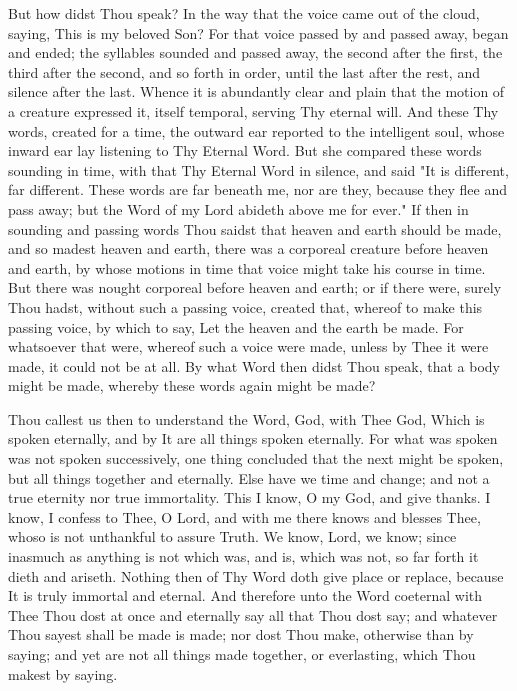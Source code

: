 \documentclass[b5paper,openright,12pt,twoside]{book}
\begin{document}
But how didst Thou speak? In the way that the voice came out of the
cloud, saying, This is my beloved Son? For that voice passed by and
passed away, began and ended; the syllables sounded and passed away,
the second after the first, the third after the second, and so forth in
order, until the last after the rest, and silence after the last. Whence
it is abundantly clear and plain that the motion of a creature expressed
it, itself temporal, serving Thy eternal will. And these Thy words,
created for a time, the outward ear reported to the intelligent soul,
whose inward ear lay listening to Thy Eternal Word. But she compared
these words sounding in time, with that Thy Eternal Word in silence, and
said "It is different, far different. These words are far beneath me,
nor are they, because they flee and pass away; but the Word of my Lord
abideth above me for ever." If then in sounding and passing words Thou
saidst that heaven and earth should be made, and so madest heaven and
earth, there was a corporeal creature before heaven and earth, by whose
motions in time that voice might take his course in time. But there was
nought corporeal before heaven and earth; or if there were, surely Thou
hadst, without such a passing voice, created that, whereof to make this
passing voice, by which to say, Let the heaven and the earth be made.
For whatsoever that were, whereof such a voice were made, unless by
Thee it were made, it could not be at all. By what Word then didst Thou
speak, that a body might be made, whereby these words again might be
made?

Thou callest us then to understand the Word, God, with Thee God, Which
is spoken eternally, and by It are all things spoken eternally. For what
was spoken was not spoken successively, one thing concluded that the
next might be spoken, but all things together and eternally. Else have
we time and change; and not a true eternity nor true immortality. This I
know, O my God, and give thanks. I know, I confess to Thee, O Lord, and
with me there knows and blesses Thee, whoso is not unthankful to assure
Truth. We know, Lord, we know; since inasmuch as anything is not which
was, and is, which was not, so far forth it dieth and ariseth. Nothing
then of Thy Word doth give place or replace, because It is truly
immortal and eternal. And therefore unto the Word coeternal with Thee
Thou dost at once and eternally say all that Thou dost say; and whatever
Thou sayest shall be made is made; nor dost Thou make, otherwise than by
saying; and yet are not all things made together, or everlasting, which
Thou makest by saying.
\end{document}
